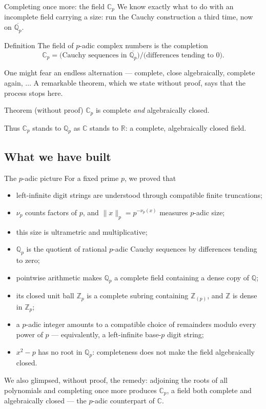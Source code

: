 \documentclass[aspectratio=169,11pt]{beamer}
\newcommand{\Z}{\mathbb Z}
\newcommand{\Q}{\mathbb Q}
\newcommand{\R}{\mathbb R}
\newcommand{\C}{\mathbb C}
\begin{document}
\begin{frame}{Completing once more: the field \(\C_p\)}
  We know exactly what to do with an incomplete field carrying a size:
  run the Cauchy construction a third time, now on \(\overline{\Q_p}\).

  \begin{block}{Definition}
    The field of \alert{\(p\)-adic complex numbers} is the completion
    \[
      \boxed{\C_p
        =\bigl(\text{Cauchy sequences in }\overline{\Q_p}\bigr)
        \big/\bigl(\text{differences tending to }0\bigr).}
    \]
  \end{block}

  One might fear an endless alternation --- complete, close
  algebraically, complete again, \(\ldots\)  A remarkable theorem, which
  we state without proof, says that the process stops here.

  \begin{alertblock}{Theorem (without proof)}
    \(\C_p\) is complete \emph{and} algebraically closed.
  \end{alertblock}

  Thus \(\C_p\) stands to \(\Q_p\) as \(\C\) stands to \(\R\): a
  complete, algebraically closed field.
\end{frame}

\subsection{What we have built}

\begin{frame}{The \(p\)-adic picture}
  \small
  For a fixed prime \(p\), we proved that
  \begin{itemize}
    \item left-infinite digit strings are understood through compatible
      finite truncations;
    \item \(\nu_p\) counts factors of \(p\), and \(\|x\|_p=p^{-\nu_p(x)}\)
      measures \(p\)-adic size;
    \item this size is ultrametric and multiplicative;
    \item \(\Q_p\) is the quotient of rational \(p\)-adic Cauchy sequences
      by differences tending to zero;
    \item pointwise arithmetic makes \(\Q_p\) a complete field containing
      a dense copy of \(\Q\);
    \item its closed unit ball \(\Z_p\) is a complete subring containing
      \(\Z_{(p)}\), and \(\Z\) is dense in \(\Z_p\);
    \item a \(p\)-adic integer amounts to a compatible choice of
      remainders modulo every power of \(p\) --- equivalently, a
      left-infinite base-\(p\) digit string;
    \item \(x^2-p\) has no root in \(\Q_p\): completeness does not make
      the field algebraically closed.
  \end{itemize}

  \medskip
  We also glimpsed, without proof, the remedy: adjoining the roots of all
  polynomials and completing once more produces \(\C_p\), a field both
  complete and algebraically closed --- the \(p\)-adic counterpart of
  \(\C\).
\end{frame}
\end{document}
